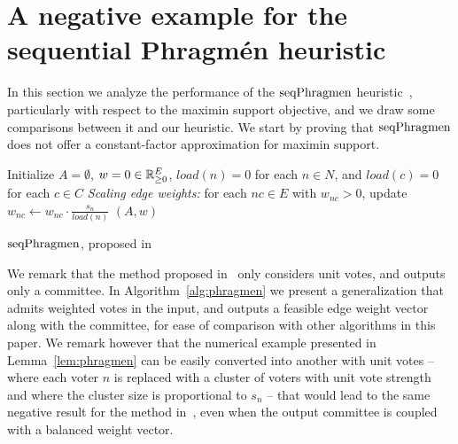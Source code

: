 \section{A negative example for the sequential Phragm\'{e}n heuristic}\label{s:phragmen}

In this section we analyze the performance of the $\operatorname{seqPhragmen}$ heuristic~\cite{brill2017phragmen}, particularly with respect to the maximin support objective, and we draw some comparisons between it and our heuristic. 
We start by proving that $\operatorname{seqPhragmen}$ does not offer a constant-factor approximation for maximin support.

\begin{algorithm}[htb]\label{alg:phragmen}
\SetAlgoLined
{}
Initialize $A=\emptyset$, $w=0\in \mathbb{R}_{\geq 0}^E$, $load(n)=0$ for each $n\in N$, and $load(c)=0$ for each $c\in C$\;
\emph{Scaling edge weights:} for each $nc\in E$ with $w_{nc}>0$, update $w_{nc}\leftarrow w_{nc}\cdot \frac{s_n}{load(n)}$\; 
\Return $(A,w)$\;
\caption{$\operatorname{seqPhragmen}$, proposed in~\cite{brill2017phragmen}}
\end{algorithm}

We remark that the method proposed in~\cite{brill2017phragmen} only considers unit votes, and outputs only a committee. 
In Algorithm~\ref{alg:phragmen} we present a generalization that admits weighted votes in the input, and outputs a feasible edge weight vector along with the committee, for ease of comparison with other algorithms in this paper. 
We remark however that the numerical example presented in Lemma~\ref{lem:phragmen} can be easily converted into another with unit votes -- where each voter $n$ is replaced with a cluster of voters with unit vote strength and where the cluster size is proportional to $s_n$ -- that would lead to the same negative result for the method in~\cite{brill2017phragmen}, 
even when the output committee is coupled with a balanced weight vector.

